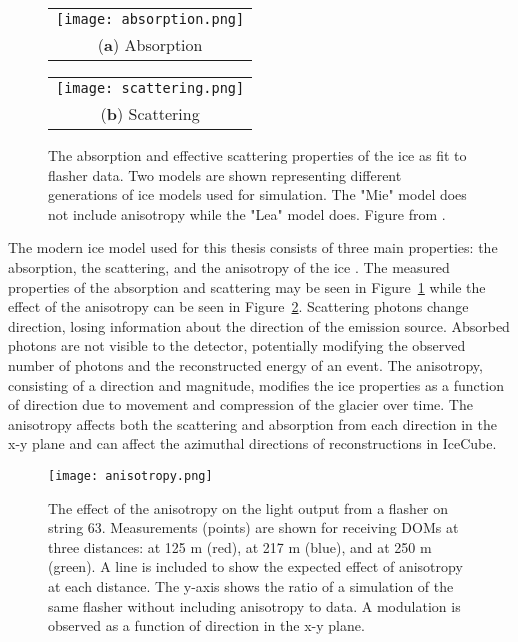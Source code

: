 \begin{figure}[h]
\centering
\begin{tabular}[b]{c}
  \texttt{[image: absorption.png]} \\
  \small (\textbf{\color{ctcolormain}a}) Absorption
\end{tabular} \hspace{2pt}
\begin{tabular}[b]{c}
  \texttt{[image: scattering.png]} \\
  \small (\textbf{\color{ctcolormain}b}) Scattering
\end{tabular}
\caption{The absorption and effective scattering properties of the ice as fit to flasher data. Two models are shown representing different generations of ice models used for simulation. The "Mie" model does not include anisotropy while the "Lea" model does. Figure from \cite{IceCube-SpiceLea}.}
\label{fig:spicelea}
\end{figure}

The modern ice model used for this thesis consists of three main properties: the absorption, the scattering, and the anisotropy of the ice \cite{IceCube-SpiceLea}.
The measured properties of the absorption and scattering may be seen in Figure~\ref{fig:spicelea} while the effect of the anisotropy can be seen in Figure~\ref{fig:anisotropy}.
Scattering photons change direction, losing information about the direction of the emission source.
Absorbed photons are not visible to the detector, potentially modifying the observed number of photons and the reconstructed energy of an event.
The anisotropy, consisting of a direction and magnitude, modifies the ice properties as a function of direction due to movement and compression of the glacier over time.
The anisotropy affects both the scattering and absorption from each direction in the x-y plane and can affect the azimuthal directions of reconstructions in IceCube.

\begin{figure}[h]
\centering
\texttt{[image: anisotropy.png]}
\caption{The effect of the anisotropy on the light output from a flasher on string 63. Measurements (points) are shown for receiving DOMs at three distances: at 125 m (red), at 217 m (blue), and at 250 m (green). A line is included to show the expected effect of anisotropy at each distance. The y-axis shows the ratio of a simulation of the same flasher without including anisotropy to data. A modulation is observed as a function of direction in the x-y plane.}
\label{fig:anisotropy}
\end{figure}


